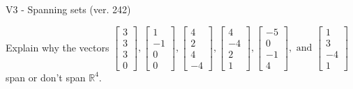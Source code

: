 \begin{exercise}
  \begin{exerciseTitle}V3 - Spanning sets (ver. 242)\end{exerciseTitle}
  \begin{exerciseStatement}
    Explain why the vectors \(\left[\begin{array}{r}
3 \\
3 \\
3 \\
0
\end{array}\right] , \left[\begin{array}{r}
1 \\
-1 \\
0 \\
0
\end{array}\right] , \left[\begin{array}{r}
4 \\
2 \\
4 \\
-4
\end{array}\right] , \left[\begin{array}{r}
4 \\
-4 \\
2 \\
1
\end{array}\right] , \left[\begin{array}{r}
-5 \\
0 \\
-1 \\
4
\end{array}\right] , \text{ and } \left[\begin{array}{r}
1 \\
3 \\
-4 \\
1
\end{array}\right]\) span or don't span \(\mathbb{R}^4\). 
	



\end{exerciseStatement}
\end{exercise}
